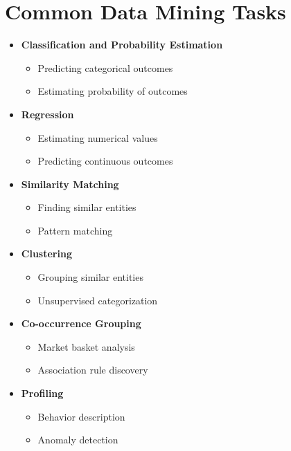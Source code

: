 \section{Common Data Mining Tasks}
\begin{itemize}
    \item \textbf{Classification and Probability Estimation}
    \begin{itemize}
        \item Predicting categorical outcomes
        \item Estimating probability of outcomes
    \end{itemize}
    
    \item \textbf{Regression}
    \begin{itemize}
        \item Estimating numerical values
        \item Predicting continuous outcomes
    \end{itemize}
    
    \item \textbf{Similarity Matching}
    \begin{itemize}
        \item Finding similar entities
        \item Pattern matching
    \end{itemize}
    
    \item \textbf{Clustering}
    \begin{itemize}
        \item Grouping similar entities
        \item Unsupervised categorization
    \end{itemize}
    
    \item \textbf{Co-occurrence Grouping}
    \begin{itemize}
        \item Market basket analysis
        \item Association rule discovery
    \end{itemize}
    
    \item \textbf{Profiling}
    \begin{itemize}
        \item Behavior description
        \item Anomaly detection
    \end{itemize}
    

\end{itemize}
